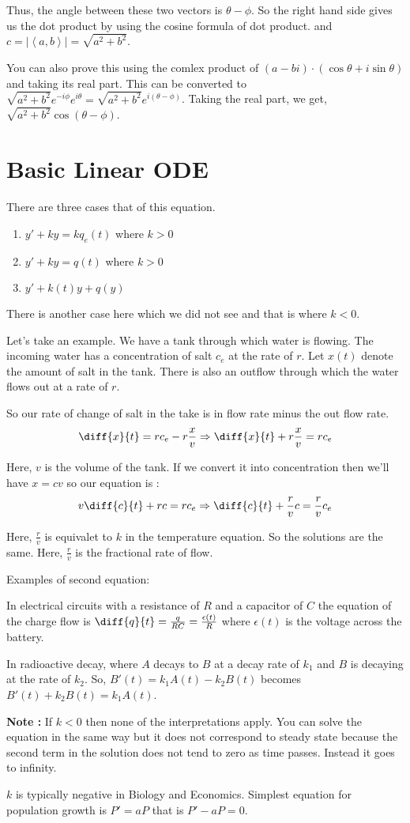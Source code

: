 Thus, the angle between these two vectors is $\theta - \phi$. So the right hand side gives us the dot product by using the cosine formula of dot product.
and $c = |\left< a, b \right>| = \sqrt{a^2 + b^2}$.

You can also prove this using the comlex product of $(a-bi)\cdot(\cos \theta + i \sin \theta)$ and taking its real part.
This can be converted to $\sqrt{a^2+b^2} e^{-i\phi} e^{i\theta} = \sqrt{a^2 + b^2} e^{i(\theta - \phi)}$.
Taking the real part, we get, $\sqrt{a^2 + b^2} \cos (\theta - \phi)$.

\pagebreak

\section{Basic Linear ODE}

There are three cases that of this equation.

\begin{enumerate}
    \item $y' + ky = kq_e(t)$ where $k > 0$
    \item $y' + ky = q(t)$ where $k > 0$
    \item $y' + k(t)y + q(y)$
\end{enumerate}

There is another case here which we did not see and that is where $k < 0$.

Let's take an example. We have a tank through which water is flowing.
The incoming water has a concentration of salt $c_e$ at the rate of $r$.
Let $x(t)$ denote the amount of salt in the tank.
There is also an outflow through which the water flows out at a rate of $r$.

So our rate of change of salt in the take is in flow rate minus the out flow rate.
$$ \diff{x}{t} = rc_e - r\frac{x}{v} \Rightarrow \diff{x}{t} + r\frac{x}{v} = rc_e $$

Here, $v$ is the volume of the tank. 
If we convert it into concentration then we'll have $x = cv$ so our equation is :
$$ v \diff{c}{t} + rc = rc_e \Rightarrow \diff{c}{t} + \frac{r}{v} c = \frac{r}{v} c_e $$ 

Here, $\frac{r}{v}$ is equivalet to $k$ in the temperature equation. 
So the solutions are the same. Here, $\frac{r}{v}$ is the fractional rate of flow.

Examples of second equation:

In electrical circuits with a resistance of $R$ and a capacitor of $C$ the equation of the charge flow is $\diff{q}{t} = \frac{q}{RC} = \frac{\epsilon(t)}{R}$ where $\epsilon(t)$ is the voltage across the battery.

In radioactive decay, where $A$ decays to $B$ at a decay rate of $k_1$ and $B$ is decaying at the rate of $k_2$.
So, $B'(t) = k_1A(t) - k_2B(t)$ becomes $B'(t) + k_2B(t) = k_1A(t)$.

{\bf Note : } If $k < 0$ then none of the interpretations apply.
You can solve the equation in the same way but it does not correspond to steady state
because the second term in the solution does not tend to zero as time passes. Instead it goes to infinity.

$k$ is typically negative in Biology and Economics.
Simplest equation for population growth is $P' = aP$ that is $P' - aP = 0$.